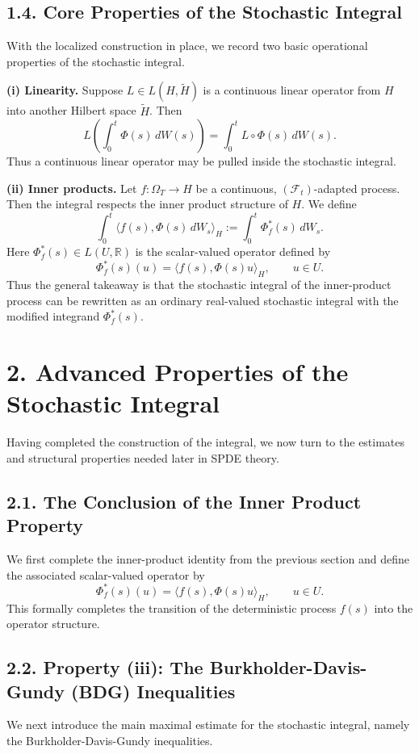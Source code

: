 \documentclass[11pt]{article}
\theoremstyle{definition}
\theoremstyle{remark}
\begin{document}
\subsection*{1.4. Core Properties of the Stochastic Integral}
With the localized construction in place, we record two basic operational properties of the stochastic integral.

\textbf{(i) Linearity.} Suppose \(L\in L(H,\widetilde H)\) is a continuous linear operator from \(H\) into another Hilbert space \(\widetilde H\). Then
\[
L\left(\int_0^t \Phi(s)\,dW(s)\right)
=
\int_0^t L\circ\Phi(s)\,dW(s).
\]
Thus a continuous linear operator may be pulled inside the stochastic integral.

\textbf{(ii) Inner products.} Let \(f:\Omega_T\to H\) be a continuous, \((\mathcal F_t)\)-adapted process. Then the integral respects the inner product structure of \(H\). We define
\[
\int_0^t \langle f(s),\Phi(s)\,dW_s\rangle_H
:=
\int_0^t \Phi_f^*(s)\,dW_s.
\]
Here \(\Phi_f^*(s)\in L(U,\mathbb R)\) is the scalar-valued operator defined by
\[
\Phi_f^*(s)(u)=\langle f(s),\Phi(s)u\rangle_H,
\qquad u\in U.
\]
Thus the general takeaway is that the stochastic integral of the inner-product process can be rewritten as an ordinary real-valued stochastic integral with the modified integrand \(\Phi_f^*(s)\).

\section*{2. Advanced Properties of the Stochastic Integral}
Having completed the construction of the integral, we now turn to the estimates and structural properties needed later in SPDE theory.

\subsection*{2.1. The Conclusion of the Inner Product Property}
We first complete the inner-product identity from the previous section and define the associated scalar-valued operator by
\[
\Phi_f^*(s)(u)=\langle f(s),\Phi(s)u\rangle_H,
\qquad u\in U.
\]
This formally completes the transition of the deterministic process \(f(s)\) into the operator structure.

\subsection*{2.2. Property (iii): The Burkholder-Davis-Gundy (BDG) Inequalities}
We next introduce the main maximal estimate for the stochastic integral, namely the Burkholder-Davis-Gundy inequalities.
\end{document}

